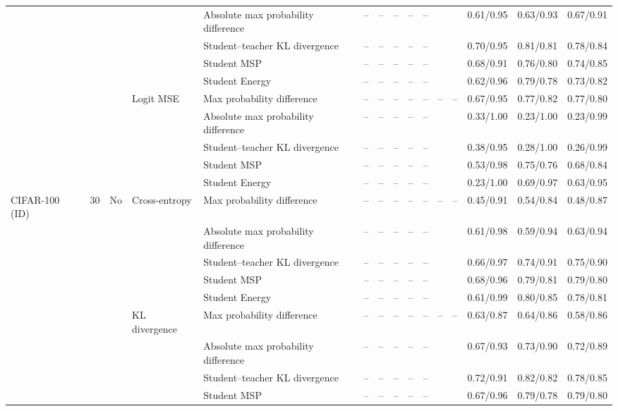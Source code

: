 \documentclass[border=2pt]{standalone}
\begin{document}
\begin{tabular}{lllllcccccccccc}
 &  &  &  & Absolute max probability difference & -- & -- & -- & -- & -- &  &  & 0.61/0.95 & 0.63/0.93 & 0.67/0.91 \\
 &  &  &  & Student--teacher KL divergence & -- & -- & -- & -- & -- &  &  & 0.70/0.95 & 0.81/0.81 & 0.78/0.84 \\
 &  &  &  & Student MSP & -- & -- & -- & -- & -- &  &  & 0.68/0.91 & 0.76/0.80 & 0.74/0.85 \\
 &  &  &  & Student Energy & -- & -- & -- & -- & -- &  &  & 0.62/0.96 & 0.79/0.78 & 0.73/0.82 \\
 &  &  & Logit MSE & Max probability difference & -- & -- & -- & -- & -- & -- & -- & 0.67/0.95 & 0.77/0.82 & 0.77/0.80 \\
 &  &  &  & Absolute max probability difference & -- & -- & -- & -- & -- &  &  & 0.33/1.00 & 0.23/1.00 & 0.23/0.99 \\
 &  &  &  & Student--teacher KL divergence & -- & -- & -- & -- & -- &  &  & 0.38/0.95 & 0.28/1.00 & 0.26/0.99 \\
 &  &  &  & Student MSP & -- & -- & -- & -- & -- &  &  & 0.53/0.98 & 0.75/0.76 & 0.68/0.84 \\
 &  &  &  & Student Energy & -- & -- & -- & -- & -- &  &  & 0.23/1.00 & 0.69/0.97 & 0.63/0.95 \\
\addlinespace
CIFAR-100 (ID) & 30 & No & Cross-entropy & Max probability difference & -- & -- & -- & -- & -- & -- & -- & 0.45/0.91 & 0.54/0.84 & 0.48/0.87 \\
 &  &  &  & Absolute max probability difference & -- & -- & -- & -- & -- &  &  & 0.61/0.98 & 0.59/0.94 & 0.63/0.94 \\
 &  &  &  & Student--teacher KL divergence & -- & -- & -- & -- & -- &  &  & 0.66/0.97 & 0.74/0.91 & 0.75/0.90 \\
 &  &  &  & Student MSP & -- & -- & -- & -- & -- &  &  & 0.68/0.96 & 0.79/0.81 & 0.79/0.80 \\
 &  &  &  & Student Energy & -- & -- & -- & -- & -- &  &  & 0.61/0.99 & 0.80/0.85 & 0.78/0.81 \\
 &  &  & KL divergence & Max probability difference & -- & -- & -- & -- & -- & -- & -- & 0.63/0.87 & 0.64/0.86 & 0.58/0.86 \\
 &  &  &  & Absolute max probability difference & -- & -- & -- & -- & -- &  &  & 0.67/0.93 & 0.73/0.90 & 0.72/0.89 \\
 &  &  &  & Student--teacher KL divergence & -- & -- & -- & -- & -- &  &  & 0.72/0.91 & 0.82/0.82 & 0.78/0.85 \\
 &  &  &  & Student MSP & -- & -- & -- & -- & -- &  &  & 0.67/0.96 & 0.79/0.78 & 0.79/0.80 \\

\end{tabular}
\end{document}
